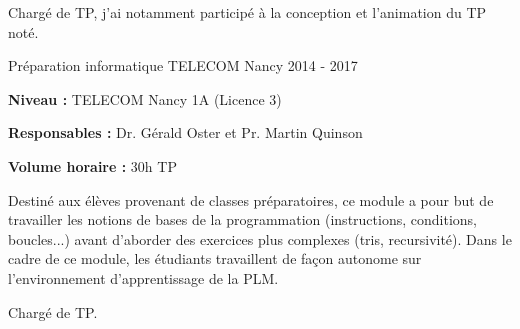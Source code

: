 \documentclass[12pt, a4paper]{awesome-cv}
\begin{document}
\begin{cventries}
  \begin{cvparagraph}
    Chargé de TP, j'ai notamment participé à la conception et l'animation du TP noté.
  \end{cvparagraph}

  \cventry
  {Préparation informatique} %
  {TELECOM Nancy} %
  {} %
  {2014 - 2017} %
  {
    \begin{cvitems}
      \item {\textbf{Niveau : } TELECOM Nancy 1A (Licence 3)}
      \item {\textbf{Responsables : } Dr. Gérald Oster et Pr. Martin Quinson}
      \item {\textbf{Volume horaire : } 30h TP}
    \end{cvitems}
  }

  \begin{cvparagraph}
    Destiné aux élèves provenant de classes préparatoires, ce module a pour but de travailler les notions de bases de la programmation (instructions, conditions, boucles...) avant d'aborder des exercices plus complexes (tris, recursivité).
    Dans le cadre de ce module, les étudiants travaillent de façon autonome sur l'environnement d'apprentissage de la PLM.
  \end{cvparagraph}

  \begin{cvparagraph}
    Chargé de TP.
  \end{cvparagraph}

\end{cventries}

\end{document}
